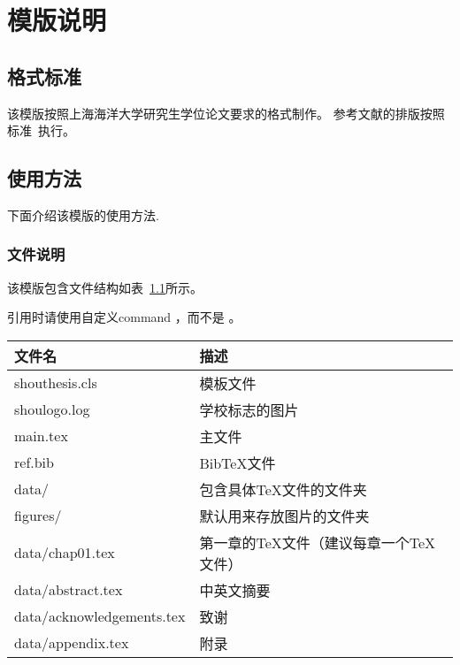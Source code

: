 
\chapter{模版说明}

\section{格式标准}

该模版按照上海海洋大学研究生学位论文要求的格式制作。
参考文献的排版按照标准~执行。

\section{使用方法}

下面介绍该模版的使用方法.



\subsection{文件说明}

该模版包含文件结构如表~\ref{tab:file}所示。

引用时请使用自定义command ，而不是 \cite{transt}。
\begin{table}[htp]
    \centering

     \label{label:figxx}
    \begin{tabular}{ll}
      \toprule
 \fixedrowheight     文件名          & 描述                         \\
      \midrule
 \fixedrowheight     shouthesis.cls   & 模板文件                     \\
 \fixedrowheight     shoulogo.log     & 学校标志的图片 \\
 \fixedrowheight     main.tex & 主文件 \\
\fixedrowheight      ref.bib & BibTeX文件    \\
  \fixedrowheight    data/ & 包含具体TeX文件的文件夹 \\
  \fixedrowheight    figures/ & 默认用来存放图片的文件夹 \\
  \fixedrowheight    data/chap01.tex & 第一章的TeX文件（建议每章一个TeX文件）\\
  \fixedrowheight    data/abstract.tex & 中英文摘要 \\
  \fixedrowheight    data/acknowledgements.tex & 致谢 \\
  \fixedrowheight    data/appendix.tex & 附录 \\
      \bottomrule
    \end{tabular}
    \label{tab:file}
  \end{table}
  
